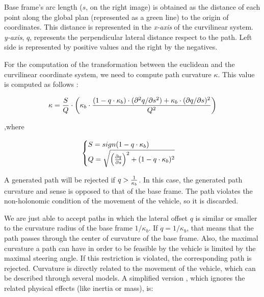 Base frame's arc length ($s$, on the right image) is obtained as the distance of each point along the global plan (represented as a green line) to the origin of coordinates. This distance is represented in the \emph{x-axis} of the curvilinear system. \emph{y-axis}, $q$, represents the perpendicular lateral distance respect to the path. Left side is represented by positive values and the right by the negatives.

For the computation of the transformation between the euclidean and the curvilinear coordinate system, we need to compute path curvature $\kappa$. This value is computed as follows \citep{chu2012local, werling2010optimal, barfoot2004motion}:

\begin{equation}\label{eq:cp07_path_curvature}
 \kappa = {S \over Q} \cdot \left ( \kappa_b \cdot { 
 {(1 - q \cdot \kappa_b) \cdot (\partial^2q / \partial s^2) +
 \kappa_b \cdot (\partial q / \partial s )^2
 } 
 \over {Q^2} } \right )
\end{equation}

,where 

\begin{equation}\label{eq:cp07_path_curvature_s_and_q}
\begin{cases}
S=sign(1 - q \cdot \kappa_b)\\
Q=\sqrt{\left ( { {\partial q} \over {\partial s}} \right ) ^2+ (1 - q \cdot \kappa_b)^2}
\end{cases}
\end{equation}

A generated path will be rejected if $q > {1 \over \kappa_b}$. In this case, the generated path curvature and sense is opposed to that of the base frame. The path violates the non-holonomic condition of the movement of the vehicle, so it is discarded.

We are just able to accept paths in which the lateral offset $q$ is similar or smaller to the curvature radius of the base frame $1 / \kappa_b$. If $q = 1 / \kappa_b$, that means that the path passes through the center of curvature of the base frame. Also, the maximal curvature a path can have in order to be feasible by the vehicle is limited by the maximal steering angle. If this restriction is violated, the corresponding path is rejected. Curvature is directly related to the movement of the vehicle, which can be described through several models. A simplified version  \citep{chu2012local, barfoot2004motion}, which ignores the related physical effects (like inertia or mass), is:

